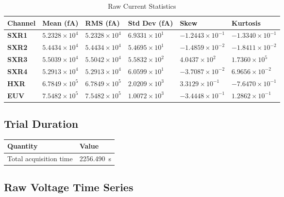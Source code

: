 \documentclass[12pt]{article}
\begin{document}
\begin{table}[H]
\centering
\caption{Raw Current Statistics} \label{tab:full_raw_stats}
\begin{tabular}{|C{0.9in}|C{1.08in}|C{1.08in}|C{1.08in}|C{1.08in}|C{1.08in}|}
\hline
\textbf{Channel} & \textbf{Mean (fA)} & \textbf{RMS (fA)} & \textbf{Std Dev (fA)} & \textbf{Skew} & \textbf{Kurtosis} \\
\hline
\textbf{SXR1} & $5.2328 \times 10^{4}$ & $5.2328 \times 10^{4}$ & $6.9331 \times 10^{1}$ & $-1.2443 \times 10^{-1}$ & $-1.3340 \times 10^{-1}$ \\
\hline
\textbf{SXR2} & $5.4434 \times 10^{4}$ & $5.4434 \times 10^{4}$ & $5.4695 \times 10^{1}$ & $-1.4859 \times 10^{-2}$ & $-1.8411 \times 10^{-2}$ \\
\hline
\textbf{SXR3} & $5.5039 \times 10^{4}$ & $5.5042 \times 10^{4}$ & $5.5832 \times 10^{2}$ & $4.0437 \times 10^{2}$ & $1.7360 \times 10^{5}$ \\
\hline
\textbf{SXR4} & $5.2913 \times 10^{4}$ & $5.2913 \times 10^{4}$ & $6.0599 \times 10^{1}$ & $-3.7087 \times 10^{-2}$ & $6.9656 \times 10^{-2}$ \\
\hline
\textbf{HXR} & $6.7849 \times 10^{5}$ & $6.7849 \times 10^{5}$ & $2.0209 \times 10^{3}$ & $3.3129 \times 10^{-1}$ & $-7.6470 \times 10^{-1}$ \\
\hline
\textbf{EUV} & $7.5482 \times 10^{5}$ & $7.5482 \times 10^{5}$ & $1.0072 \times 10^{3}$ & $-3.4448 \times 10^{-1}$ & $1.2862 \times 10^{-1}$ \\
\hline
\end{tabular}
\end{table}


\subsection{Trial Duration}

\begin{center}
\begin{tabular}{|C{2in}|C{2in}|}
\hline
\textbf{Quantity} & \textbf{Value} \\
\hline
Total acquisition time & 2256.490~s \\
\hline
\end{tabular}
\end{center}


\subsection{Raw Voltage Time Series}
\end{document}
